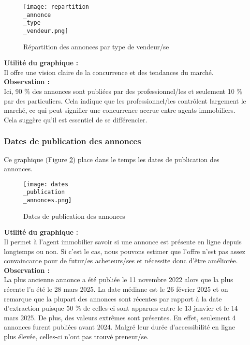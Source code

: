 \documentclass[a4paper, 12pt, twoside]{report}
\begin{document}
			\begin{figure}[h]
				\centering
				\texttt{[image: repartition\\\_annonce\\\_type\\\_vendeur.png]}
				\caption{Répartition des annonces par type de vendeur/se}
				\label{repartitionAnnonceTypeVendeur}
			\end{figure}

			{\bf Utilité du graphique :} \\

			Il offre une vision claire de la concurrence et des tendances du marché. \\

			{\bf Observation :} \\

			Ici, 90 \% des annonces sont publiées par des professionnel/les et seulement 10 \% par des particuliers. Cela indique que les professionnel/les contrôlent largement le marché, ce qui peut signifier une concurrence accrue entre agents immobiliers. Cela suggère qu'il est essentiel de se différencier.

			\subsubsection{Dates de publication des annonces}
			
			Ce graphique (Figure \ref{datesPublicationAnnonces}) place dans le temps les dates de publication des annonces. \\

			\begin{figure}[h]
				\centering
				\texttt{[image: dates\\\_publication\\\_annonces.png]}
				\caption{Dates de publication des annonces}
				\label{datesPublicationAnnonces}
			\end{figure}

			{\bf Utilité du graphique :} \\

			Il permet à l'agent immobilier savoir si une annonce est présente en ligne depuis longtemps ou non. Si c'est le cas, nous pouvons estimer que l'offre n'est pas assez convaincante pour de futur/es acheteurs/ses et nécessite donc d'être améliorée. \\

			{\bf Observation :} \\

			La plus ancienne annonce a été publiée le 11 novembre 2022 alors que la plus récente l'a été le 28 mars 2025. La date médiane est le 26 février 2025 et on remarque que la plupart des annonces sont récentes par rapport à la date d'extraction puisque 50 \% de celles-ci sont apparues entre le 13 janvier et le 14 mars 2025. De plus, des valeurs extrêmes sont présentes. En effet, seulement 4 annonces furent publiées avant 2024. Malgré leur durée d'accessibilité en ligne plus élevée, celles-ci n'ont pas trouvé preneur/se. \\
			
\end{document}
